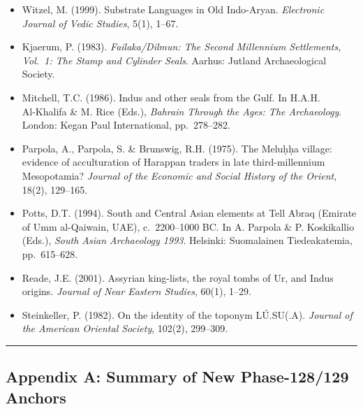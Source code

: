 \documentclass[
]{article}
\begin{document}
\begin{itemize}
  Wells, B. (2011). \emph{The Archaeology and Epigraphy of Indus
  Writing}. Oxford: Archaeopress.
\item
  Witzel, M. (1999). Substrate Languages in Old Indo-Aryan.
  \emph{Electronic Journal of Vedic Studies}, 5(1), 1--67.
\item
  Kjaerum, P. (1983). \emph{Failaka/Dilmun: The Second Millennium
  Settlements, Vol.~1: The Stamp and Cylinder Seals}. Aarhus:
  Jutland Archaeological Society.
\item
  Mitchell, T.C. (1986). Indus and other seals from the Gulf. In
  H.A.H.\\ Al-Khalifa \& M. Rice (Eds.), \emph{Bahrain Through the
  Ages: The Archaeology}. London: Kegan Paul International, pp.~278--282.
\item
  Parpola, A., Parpola, S. \& Brunswig, R.H. (1975). The Melu\d{h}\d{h}a
  village: evidence of acculturation of Harappan traders in late
  third-millennium Mesopotamia? \emph{Journal of the Economic and
  Social History of the Orient}, 18(2), 129--165.
\item
  Potts, D.T. (1994). South and Central Asian elements at Tell Abraq
  (Emirate of Umm al-Qaiwain, UAE), c.~2200--1000 BC. In
  A. Parpola \& P. Koskikallio (Eds.), \emph{South Asian Archaeology
  1993}. Helsinki: Suomalainen Tiedeakatemia, pp.~615--628.
\item
  Reade, J.E. (2001). Assyrian king-lists, the royal tombs of Ur, and
  Indus origins. \emph{Journal of Near Eastern Studies}, 60(1), 1--29.
\item
  Steinkeller, P. (1982). On the identity of the toponym
  L\'{U}.SU(.A). \emph{Journal of the American Oriental Society},
  102(2), 299--309.
\end{itemize}

\begin{center}\rule{0.5\linewidth}{0.5pt}\end{center}

\subsection{Appendix A: Summary of New Phase-128/129
Anchors}\label{appendix-a-summary-of-new-phase-128129-anchors}
\end{document}
